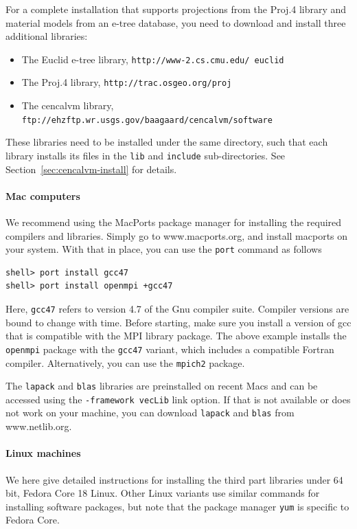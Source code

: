 \documentclass[11pt]{report}
\begin{document}
For a complete installation that supports projections from the Proj.4 library and material models
from an e-tree database, you need to download and install three additional libraries:
\begin{itemize}
\item The Euclid e-tree library, {\tt http://www-2.cs.cmu.edu/~euclid}
\item The Proj.4 library, {\tt http://trac.osgeo.org/proj}
\item The cencalvm library, {\tt ftp://ehzftp.wr.usgs.gov/baagaard/cencalvm/software}
\end{itemize}
These libraries need to be installed under the same directory, such that each library installs its
files in the {\tt lib} and {\tt include} sub-directories. See Section~\ref{sec:cencalvm-install} for
details.

\paragraph{Mac computers}

We recommend using the MacPorts package manager for installing the required compilers and
libraries. Simply go to www.macports.org, and install macports on your system. With that in place,
you can use the \verb+port+ command as follows
\begin{verbatim}
shell> port install gcc47
shell> port install openmpi +gcc47
\end{verbatim}
Here, \verb+gcc47+ refers to version 4.7 of the Gnu compiler suite. Compiler versions are bound to
change with time. Before starting, make sure you install a version of gcc that is compatible with
the MPI library package. The above example installs the \verb+openmpi+ package with the \verb+gcc47+
variant, which includes a compatible Fortran compiler. Alternatively, you can use the \verb+mpich2+
package.

The \verb+lapack+ and \verb+blas+ libraries are preinstalled on recent Macs and can be accessed
using the \verb+-framework vecLib+ link option. If that is not available or does not work on your
machine, you can download \verb+lapack+ and \verb+blas+ from www.netlib.org.

\paragraph{Linux machines}
We here give detailed instructions for installing the third part libraries under 64 bit, Fedora Core
18 Linux. Other Linux variants use similar commands for installing software packages, but note that 
the package manager \verb+yum+ is specific to Fedora Core.
\end{document}
